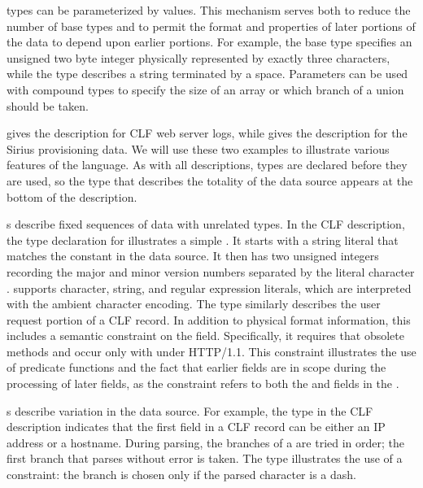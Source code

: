 \documentclass{sig-alternate}
\newcommand{\dibbler}{Sirius}
\begin{document}
\pads{} types can be parameterized by values.
This mechanism
serves both to reduce the number of base types and to permit the
format and properties of later portions of the data to depend upon earlier portions.
For example, 
the base type  specifies an unsigned two byte integer
physically represented by exactly three characters, while the type
describes a string terminated by a space.  Parameters can be 
used with compound types to specify the size of an array or which
branch of a union should be taken.




 gives the \pads{} description for CLF web server logs, 
while  gives the description for the \dibbler{} 
provisioning data.  We will use these two examples to illustrate various 
features of the \pads{} language.  As with all \pads{} descriptions, types are declared before they are used, so the type that describes the totality of the data source appears at the bottom of the description.

s describe fixed sequences of data with unrelated types.
In the CLF description, the type declaration for
 illustrates a simple . It starts with a 
string literal that matches the constant  in the data source.  It 
then has two unsigned integers recording the major and minor version numbers
separated by the literal character .  \pads{} supports character, string,
and regular expression literals, which are interpreted with the ambient character 
encoding. The type  
similarly describes the user request portion of a CLF record.  In addition
to physical format information, this  includes a semantic constraint
on the  field.  Specifically, it requires that obsolete methods
 and  occur only with under HTTP/1.1.  This constraint illustrates
the use of predicate functions and the fact 
that earlier fields are in scope during the processing of later fields, as the 
constraint
refers to both the  and  fields in the .

s describe variation in the data source.  For example, the
 type in the CLF description indicates that the first field 
in a CLF record can be either an IP address or a hostname.  During parsing, 
the branches of a  are tried in order; the first branch that 
parses without error is taken.  The  type illustrates the use
of a constraint: the branch  is chosen only if the parsed
character is a dash.  
\end{document}
